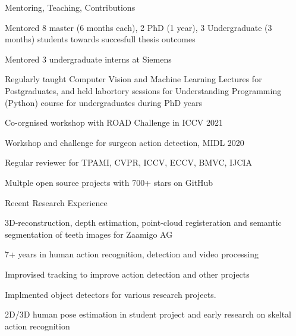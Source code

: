 \documentclass{resume} %
\begin{document}
\begin{multicols}{2}
\begin{mSection}{Mentoring, Teaching, Contributions}{} 
  \begin{sSubsection}{Mentored 8 master (6 months each), 2 PhD (1 year), 3 Undergraduate (3 months) students towards succesfull thesis outcomes}\end{sSubsection}
  \begin{sSubsection}{Mentored 3 undergraduate interns at Siemens}\end{sSubsection}
  \begin{sSubsection}{Regularly taught Computer Vision and Machine Learning Lectures for Postgraduates, 
    and held labortory sessions for Understanding Programming (Python) course for undergraduates during PhD years}\end{sSubsection}
  \begin{sSubsection}{Co-orgnised workshop with ROAD Challenge in ICCV 2021}\end{sSubsection}
  \begin{sSubsection}{Workshop and challenge for surgeon action detection, MIDL 2020}\end{sSubsection}
  \begin{sSubsection}{Regular reviewer for TPAMI, CVPR, ICCV, ECCV, BMVC, IJCIA}\end{sSubsection}
  \begin{sSubsection}{Multple open source projects with 700+ stars on GitHub}\end{sSubsection}
\end{mSection}

\begin{mSection}{Recent Research Experience}{} 
  \begin{sSubsection}{3D-reconstruction, depth estimation, point-cloud registeration and semantic segmentation of teeth images for Zaamigo AG}\end{sSubsection}
  \begin{sSubsection}{7+ years in human action recognition, detection and  video processing}\end{sSubsection}
  \begin{sSubsection}{Improvised tracking to improve action detection and other projects}\end{sSubsection}
  \begin{sSubsection}{Implmented object detectors for various research projects.}\end{sSubsection}
  \begin{sSubsection}{2D/3D human pose estimation in student project and early research on skeltal action recognition}\end{sSubsection}

\end{mSection}

\end{multicols}
\end{document}

